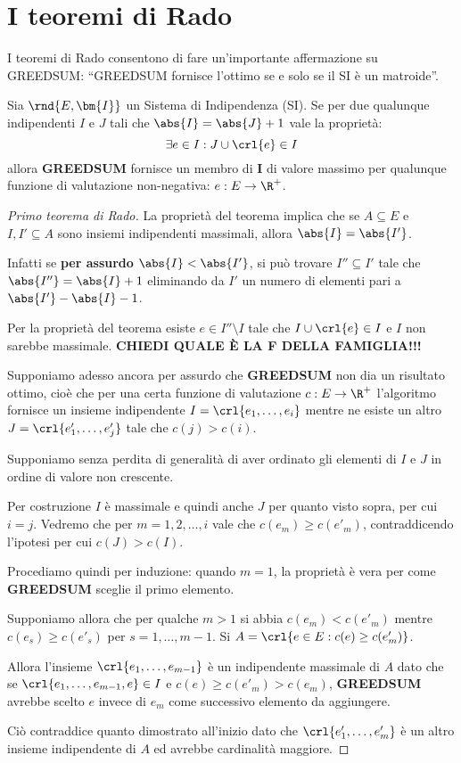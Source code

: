 \documentclass[\main/main.tex]{subfiles}
\begin{document}
\section{I teoremi di Rado}
I teoremi di Rado consentono di fare un'importante affermazione su GREEDSUM: ``GREEDSUM fornisce l'ottimo se e solo se il SI è un matroide''.
\begin{theorem}
  Sia \(\rnd{E, \bm{I}}\) un Sistema di Indipendenza (SI). Se per due qualunque indipendenti \(I\) e \(J\) tali che \(\abs{I} = \abs{J} + 1\) vale la proprietà:
  \[
    \exists e \in I: J \cup \crl{e} \in I
  \]
  allora \textbf{GREEDSUM} fornisce un membro di \(\bm{I}\) di valore massimo per qualunque funzione di valutazione non-negativa: \(e: E \rightarrow \R^+\).
  \label{primo_rado}
\end{theorem}
\begin{proof}[Primo teorema di Rado]
  La proprietà del teorema implica che se \(A \subseteq E\) e \(I, I' \subseteq A\) sono insiemi indipendenti massimali, allora \(\abs{I} = \abs{I'}\).

  Infatti se \textbf{per assurdo} \(\abs{I} < \abs{I'}\), si può trovare \(I'' \subseteq I'\) tale che \(\abs{I''} = \abs{I} + 1\) eliminando da \(I'\) un numero di elementi pari a \(\abs{I'} - \abs{I} - 1\).

  Per la proprietà del teorema esiste \(e \in I'' \setminus I\) tale che \(I \cup \crl{e} \in I\) e \(I\) non sarebbe massimale. \textbf{CHIEDI QUALE È LA F DELLA FAMIGLIA!!!}

  Supponiamo adesso ancora per assurdo che \textbf{GREEDSUM} non dia un risultato ottimo, cioè che per una certa funzione di valutazione \(c: E \rightarrow \R^+\) l'algoritmo fornisce un insieme indipendente \(I = \crl{e_1, \ldots, e_i}\) mentre ne esiste un altro \(J = \crl{e'_1, \ldots, e'_j}\) tale che \(c(j) > c(i)\).

  Supponiamo senza perdita di generalità di aver ordinato gli elementi di \(I\) e \(J\) in ordine di valore non crescente.

  Per costruzione \(I\) è massimale e quindi anche \(J\) per quanto visto sopra, per cui \(i=j\). Vedremo che per \(m=1, 2, \ldots, i\) vale che \(c(e_m) \geq c(e'_m)\), contraddicendo l'ipotesi per cui \(c(J) > c(I)\).

  Procediamo quindi per induzione: quando \(m=1\), la proprietà è vera per come \textbf{GREEDSUM} sceglie il primo elemento.

  Supponiamo allora che per qualche \(m>1\) si abbia \(c(e_m) < c(e'_m)\) mentre \(c(e_s) \geq c(e'_s)\) per \(s = 1, \ldots, m-1\). Si \(A = \crl{e \in E: c(e) \geq c(e'_m)}\).

  Allora l'insieme \(\crl{e_1, \ldots, e_{m-1}}\) è un indipendente massimale di \(A\) dato che se \(\crl{e_1, \ldots, e_{m-1}, e} \in I\) e \(c(e) \geq c(e'_m) > c(e_m)\), \textbf{GREEDSUM} avrebbe scelto \(e\) invece di \(e_m\) come successivo elemento da aggiungere.

  Ciò contraddice quanto dimostrato all'inizio dato che \(\crl{e'_1, \ldots, e'_m}\) è un altro insieme indipendente di \(A\) ed avrebbe cardinalità maggiore.
\end{proof}
\end{document}
